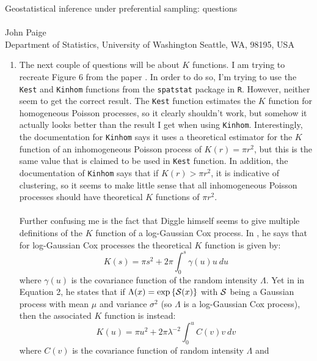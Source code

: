 \documentclass{uwstat572}
\begin{document}

\begin{center}
  {\LARGE Geostatistical inference under preferential sampling: questions}\\\ \\
  {John Paige \\ 
    Department of Statistics, University of Washington Seattle, WA, 98195, USA
  }
\end{center}

\begin{enumerate}
\item The next couple of questions will be about $K$ functions.  I am trying to recreate Figure 6 from the paper \cite{diggle2010}.  In order to do so, I'm trying to use the \verb|Kest| and \verb|Kinhom| functions from the \verb|spatstat| package in \verb|R|.  However, neither seem to get the correct result.  The \verb|Kest| function estimates the $K$ function for homogeneous Poisson processes, so it clearly shouldn't work, but somehow it actually looks better than the result I get when using \verb|Kinhom|.  Interestingly, the documentation for \verb|Kinhom| says it uses a theoretical estimator for the $K$ function of an inhomogeneous Poisson process of $K(r) = \pi r^2$, but this is the same value that is claimed to be used in \verb|Kest| function.  In addition, the documentation of \verb|Kinhom| says that if $K(r) > \pi r^2$, it is indicative of clustering, so it seems to make little sense that all inhomogeneous Poisson processes should have theoretical $K$ functions of $\pi r^2$.
\\\\
Further confusing me is the fact that Diggle himself seems to give multiple definitions of the $K$ function of a log-Gaussian Cox process.  In \cite{diggle2010}, he says that for log-Gaussian Cox processes the theoretical $K$ function is given by: 
$$ K(s) = \pi s^2 + 2 \pi \int_0^s \gamma(u) u \ du $$
where $\gamma(u)$ is the covariance function of the random intensity $\Lambda$.  Yet in \cite{diggle2013} in Equation 2, he states that if $\Lambda(x) = \text{exp}\left\{\mathcal{S}(x)\right\}$ with $\mathcal{S}$ being a Gaussian process with mean $\mu$ and variance $\sigma^2$ (so $\Lambda$ is a log-Gaussian Cox process), then the associated $K$ function is instead:
$$ K(u) = \pi u^2 + 2 \pi \lambda^{-2} \int_0^u C(v) v \ dv $$
where $C(v)$ is the covariance function of random intensity $\Lambda$ and

\end{enumerate}
\end{document}
